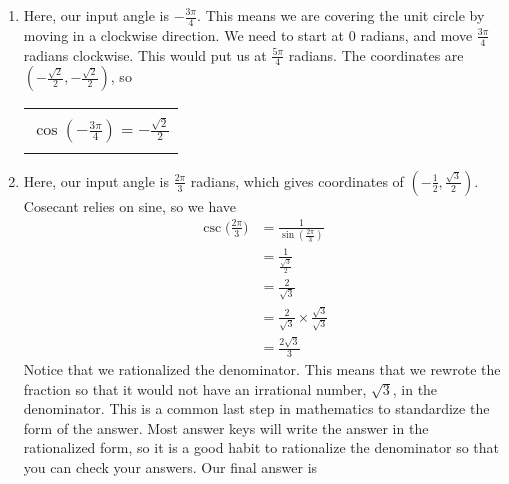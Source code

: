 {\begin{enumerate}
		\begin{equation*}
			\begin{split}
				\sec{(3\pi)} & = \frac{1}{\cos{(3\pi)}} \\[6pt]
					     & = \frac{1}{-1} \\[6pt]
					     & = -1
			\end{split}
		\end{equation*}
		So, we have
			\begin{center}
		\begin{tabular}{| c |} \hline
			\\[-8pt]
			$\displaystyle \sec{(3\pi)}= -1$ \\[-8pt]
			\\\hline
		\end{tabular}
	\end{center}
	\item Here, our input angle is $-\frac{3\pi}{4}$. This means we are covering the unit circle by moving in a clockwise direction. We need to start at $0$ radians, and move $\frac{3\pi}{4}$ radians clockwise. This would put us at $\frac{5\pi}{4}$ radians. The coordinates are $(-\frac{\sqrt{2}}{2}, -\frac{\sqrt{2}}{2})$, so 
			\begin{center}
		\begin{tabular}{| c |} \hline
			\\[-8pt]
			$\displaystyle \cos{(-\frac{3\pi}{4})} = -\frac{\sqrt{2}}{2}$ \\[-8pt]
			\\\hline
		\end{tabular}
	\end{center}
	\item Here, our input angle is $\frac{2\pi}{3}$ radians, which gives coordinates of $(-\frac{1}{2}, \frac{\sqrt{3}}{2})$. Cosecant relies on sine, so we have
		\begin{equation*}
			\begin{split}
				\csc{\bigg(\frac{2\pi}{3}\bigg)} & = \frac{1}{\sin{(\frac{2\pi}{3})}} \\[6pt]
						       & = \frac{1}{\frac{\sqrt{3}}{2}} \\[6pt]
						       & = \frac{2}{\sqrt{3}} \\[6pt]
						       & = \frac{2}{\sqrt{3}} \times \frac{\sqrt{3}}{\sqrt{3}} \\[6pt]
						       & = \frac{2\sqrt{3}}{3}
			\end{split}
		\end{equation*}
		Notice that we rationalized the denominator. This means that we rewrote the fraction so that it would not have an irrational number, $\sqrt{3}$, in the denominator. This is a common last step in mathematics to standardize the form of the answer. Most answer keys will write the answer in the rationalized form, so it is a good habit to rationalize the denominator so that you can check your answers. Our final answer is

\end{enumerate}}
